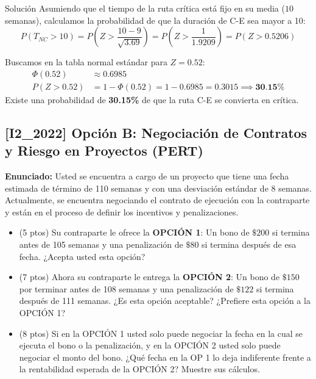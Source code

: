 \documentclass[11pt, a4paper]{article}
\begin{document}
\begin{ejercicio}{Solución}
  Asumiendo que el tiempo de la ruta crítica está fijo en su media ($10$ semanas), calculamos la probabilidad de que la duración de C-E sea mayor a 10:
  \begin{equation*}
    P(T_{NC} > 10) = P\left(Z > \frac{10 - 9}{\sqrt{3.69}}\right) = P\left(Z > \frac{1}{1.9209}\right) = P(Z > 0.5206)
  \end{equation*}

  Buscamos en la tabla normal estándar para $Z = 0.52$:
  \begin{align*}
    \Phi(0.52) &\approx 0.6985 \\
    P(Z > 0.52) &= 1 - \Phi(0.52) = 1 - 0.6985 = 0.3015 \implies \textbf{30.15\%}
  \end{align*}
  Existe una probabilidad de \textbf{30.15\%} de que la ruta C-E se convierta en crítica.

\end{ejercicio}

\newpage


\newpage

\subsection*{[I2_2022] Opción B: Negociación de Contratos y Riesgo en Proyectos (PERT)}
\textbf{Enunciado:}
  Usted se encuentra a cargo de un proyecto que tiene una fecha estimada de término de 110 semanas y con una desviación estándar de 8 semanas. Actualmente, se encuentra negociando el contrato de ejecución con la contraparte y están en el proceso de definir los incentivos y penalizaciones.
  \begin{itemize}
    \item[\textbf{i.}] (5 ptos) Su contraparte le ofrece la \textbf{OPCIÓN 1}: Un bono de $\$200$ si termina antes de 105 semanas y una penalización de $\$80$ si termina después de esa fecha. ¿Acepta usted esta opción?
    \item[\textbf{ii.}] (7 ptos) Ahora su contraparte le entrega la \textbf{OPCIÓN 2}: Un bono de $\$150$ por terminar antes de 108 semanas y una penalización de $\$122$ si termina después de 111 semanas. ¿Es esta opción aceptable? ¿Prefiere esta opción a la OPCIÓN 1?
    \item[\textbf{iii.}] (8 ptos) Si en la OPCIÓN 1 usted solo puede negociar la fecha en la cual se ejecuta el bono o la penalización, y en la OPCIÓN 2 usted solo puede negociar el monto del bono. ¿Qué fecha en la OP 1 lo deja indiferente frente a la rentabilidad esperada de la OPCIÓN 2? Muestre sus cálculos.
  \end{itemize}
\end{document}
